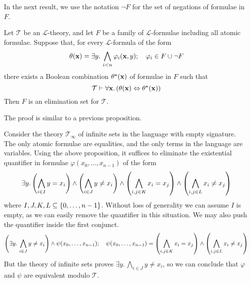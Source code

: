 In the next result, we use the notation \( \neg F \) for the set of negations of formulae in \( F \).
\begin{proposition}
    Let \( \mathcal T \) be an \( \mathcal L \)-theory, and let \( F \) be a family of \( \mathcal L \)-formulae including all atomic formulae.
    Suppose that, for every \( \mathcal L \)-formula of the form
    \[ \theta(\vb x) = \exists y.\, \bigwedge_{i < n} \varphi_i(\vb x, y);\quad \varphi_i \in F \cup \neg F \]
    there exists a Boolean combination \( \theta^\star(\vb x) \) of formulae in \( F \) such that
    \[ \mathcal T \vdash \forall \vb x.\, (\theta(\vb x) \Leftrightarrow \theta^\star(\vb x)) \]
    Then \( F \) is an elimination set for \( \mathcal T \).
\end{proposition}
The proof is similar to a previous proposition.
\begin{example}
    Consider the theory \( \mathcal T_\infty \) of infinite sets in the language with empty signature.
    The only atomic formulae are equalities, and the only terms in the language are variables.
    Using the above proposition, it suffices to eliminate the existential quantifier in formulae \( \varphi(x_0, \dots, x_{n-1}) \) of the form
    \[ \exists y.\, \qty(\bigwedge_{i \in I} y = x_i) \wedge \qty(\bigwedge_{i \in J} y \neq x_i) \wedge \qty(\bigwedge_{i, j \in K} x_i = x_j) \wedge \qty(\bigwedge_{i, j \in L} x_i \neq x_j) \]
    where \( I, J, K, L \subseteq \qty{0, \dots, n-1} \).
    Without loss of generality we can assume \( I \) is empty, as we can easily remove the quantifier in this situation.
    We may also push the quantifier inside the first conjunct.
    \[ \qty(\exists y.\, \bigwedge_{i \in J} y \neq x_i) \wedge \psi(x_0, \dots, x_{n-1});\quad \psi(x_0, \dots, x_{n-1}) = \qty(\bigwedge_{i, j \in K} x_i = x_j) \wedge \qty(\bigwedge_{i, j \in L} x_i \neq x_j) \]
    But the theory of infinite sets proves \( \exists y.\, \bigwedge_{i \in J} y \neq x_i \), so we can conclude that \( \varphi \) and \( \psi \) are equivalent modulo \( \mathcal T \).
\end{example}
